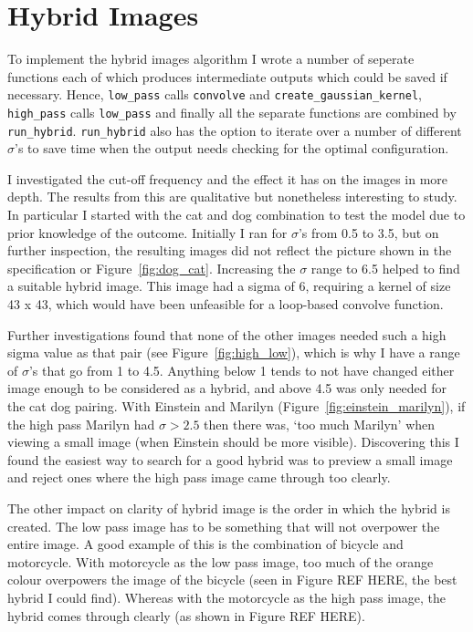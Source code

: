 \documentclass[a4paper,10pt]{article}
\begin{document}
\section{Hybrid Images}
To implement the hybrid images algorithm I wrote a number of seperate
functions each of which produces intermediate outputs which could be
saved if necessary. Hence, \lstinline|low_pass| calls \lstinline|convolve| and
\lstinline|create_gaussian_kernel|, \lstinline|high_pass| calls \lstinline|low_pass|
and finally all the separate functions are combined by \lstinline|run_hybrid|.
\lstinline|run_hybrid| also has the option to iterate over a number of different
$\sigma$'s to save time when the output needs checking for the optimal
configuration.

I investigated the cut-off frequency and the effect it has on the images in more
depth. The results from this are qualitative but nonetheless
interesting to study. In particular I started with the cat and dog combination
to test the model due to prior knowledge of the outcome. Initially I ran for $\sigma$'s
from 0.5 to 3.5, but on further inspection, the resulting images did not
reflect the picture shown in the specification or Figure~\ref{fig:dog_cat}.
Increasing the $\sigma$ range to 6.5 helped to find a suitable hybrid image.
This image had a sigma of 6, requiring a kernel of size 43 x 43, which would
have been unfeasible for a loop-based convolve function.

Further investigations found that none of the other images needed
such a high sigma value as that pair (see Figure~\ref{fig:high_low}), which is
why I have a range of $\sigma$'s
that go from 1 to 4.5. Anything below 1 tends to not have changed either image
enough to be considered as a hybrid, and above 4.5 was only needed for the cat
dog pairing. With Einstein and Marilyn (Figure~\ref{fig:einstein_marilyn}), if
the high pass Marilyn had $\sigma > 2.5$ then there was, `too much
Marilyn' when viewing a small image (when Einstein should be more visible).
Discovering this I found the easiest way to search for a good hybrid was to
preview a small image and reject ones where the high pass image came through too
clearly.

The other impact on clarity of hybrid image is the order in which the hybrid is
created. The low pass image has to be something that will not overpower the
entire image. A good example of this is the combination of bicycle and motorcycle.
With motorcycle as the low pass image, too much of the orange colour overpowers
the image of the bicycle (seen in Figure REF HERE, the best hybrid I could find).
Whereas with the motorcycle as the high pass image, the hybrid comes through
clearly (as shown in Figure REF HERE).
\end{document}
